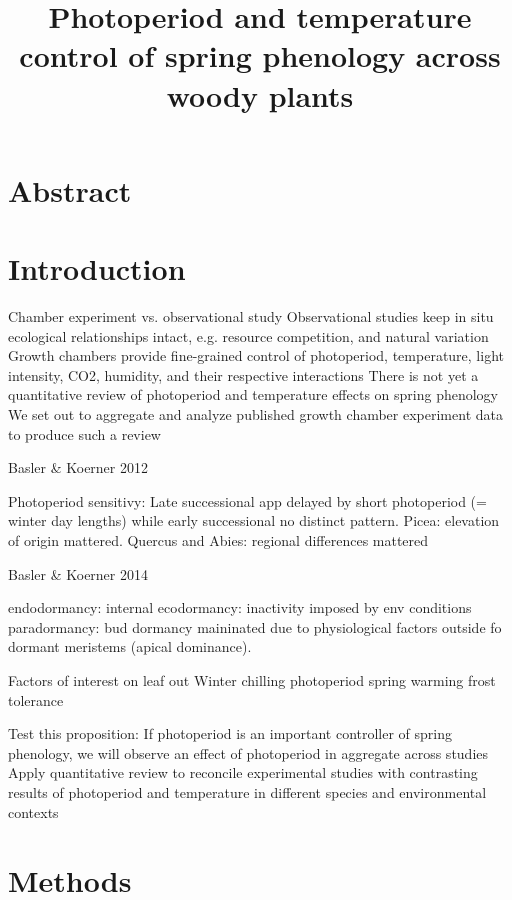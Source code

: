 \documentclass[11pt]{article}
\begin{document}
\title{Photoperiod and temperature control of spring phenology across woody plants}
\maketitle
\section*{Abstract}

\section*{Introduction}



Chamber experiment vs. observational study
Observational studies keep in situ ecological relationships intact, e.g. resource competition, and natural variation
Growth chambers provide fine-grained control of photoperiod, temperature, light intensity, CO2, humidity, and their respective interactions
There is not yet a quantitative review of photoperiod and temperature effects on spring phenology
We set out to aggregate and analyze published growth chamber experiment data to produce such a review


Basler \& Koerner 2012

Photoperiod sensitivy: Late successional app delayed by short photoperiod (= winter day lengths) while early successional no distinct pattern. 
Picea: elevation of origin mattered. 
Quercus and Abies: regional differences mattered

Basler \& Koerner 2014

endodormancy: internal
ecodormancy: inactivity imposed by env conditions
paradormancy: bud dormancy maininated due to physiological factors outside fo dormant meristems (apical dominance).

Factors of interest on leaf out 
Winter chilling
photoperiod
spring warming
frost tolerance 

Test this proposition: If photoperiod is an important controller of spring phenology, we will observe an effect of photoperiod in aggregate across studies
Apply quantitative review to reconcile experimental studies with contrasting results of photoperiod and temperature in different species and environmental contexts



\section*{Methods}
\end{document}
